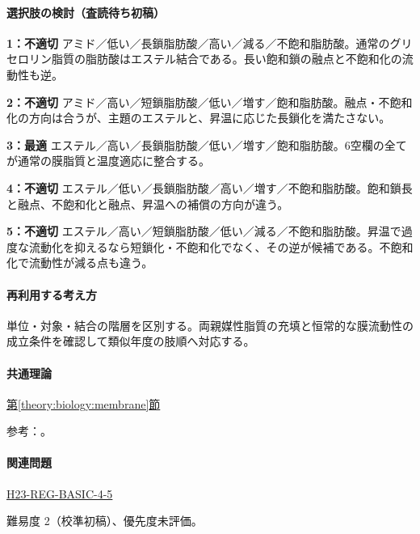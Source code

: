 \paragraph{選択肢の検討（査読待ち初稿）}\mbox{}\par

\noindent\textbf{1：不適切} アミド／低い／長鎖脂肪酸／高い／減る／不飽和脂肪酸。通常のグリセロリン脂質の脂肪酸はエステル結合である。長い飽和鎖の融点と不飽和化の流動性も逆。\par

\noindent\textbf{2：不適切} アミド／高い／短鎖脂肪酸／低い／増す／飽和脂肪酸。融点・不飽和化の方向は合うが、主題のエステルと、昇温に応じた長鎖化を満たさない。\par

\noindent\textbf{3：最適} エステル／高い／長鎖脂肪酸／低い／増す／飽和脂肪酸。6空欄の全てが通常の膜脂質と温度適応に整合する。\par

\noindent\textbf{4：不適切} エステル／低い／長鎖脂肪酸／高い／増す／不飽和脂肪酸。飽和鎖長と融点、不飽和化と融点、昇温への補償の方向が違う。\par

\noindent\textbf{5：不適切} エステル／高い／短鎖脂肪酸／低い／減る／不飽和脂肪酸。昇温で過度な流動化を抑えるなら短鎖化・不飽和化でなく、その逆が候補である。不飽和化で流動性が減る点も違う。\par

\paragraph{再利用する考え方} 単位・対象・結合の階層を区別する。両親媒性脂質の充填と恒常的な膜流動性の成立条件を確認して類似年度の肢順へ対応する。

\paragraph{共通理論} \hyperref[theory:biology:membrane]{第\ref*{theory:biology:membrane}節}

\par 参考：\cite{bio_membrane}。

\paragraph{関連問題} \hyperref[q:h23-reg-basic-4-5]{H23-REG-BASIC-4-5}

\par 難易度 2（校準初稿）、優先度未評価。

